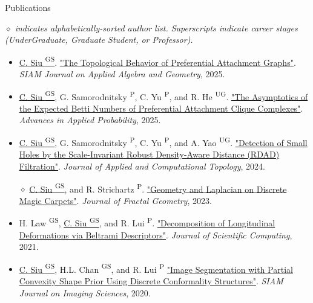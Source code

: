 \documentclass{resume} %
\begin{document}
\begin{rSection}{Publications}

\emph{$\diamond$ indicates alphabetically-sorted author list. Superscripts indicate career stages (UnderGraduate, Graduate Student, or Professor).}

\begin{itemize}[noitemsep]
    \item \underline{C. Siu {\textsuperscript{GS}}}. \href{https://epubs.siam.org/doi/10.1137/24M1693179}{"The Topological Behavior of Preferential Attachment Graphs"}. \emph{SIAM Journal on Applied Algebra and Geometry}, 2025.

    \item \underline{C. Siu {\textsuperscript{GS}}}, G. Samorodnitsky \textsuperscript{P}, C. Yu \textsuperscript{P}, and R. He \textsuperscript{UG}. \href{https://www.cambridge.org/core/journals/advances-in-applied-probability/article/asymptotics-of-the-expected-betti-numbers-of-preferential-attachment-clique-complexes/5A7074FC4F88DFDD609655A80B26C055}{"The Asymptotics of the Expected Betti Numbers of Preferential Attachment Clique Complexes"}. \emph{Advances in Applied Probability}, 2025.
    
    \item \underline{C. Siu {\textsuperscript{GS}}}, G. Samorodnitsky \textsuperscript{P}, C. Yu \textsuperscript{P}, and A. Yao \textsuperscript{UG}. \href{https://rdcu.be/dCXLa}{"Detection of Small Holes by the Scale-Invariant Robust Density-Aware Distance (RDAD) Filtration"}. \emph{Journal of Applied and Computational Topology}, 2024.
    
    \item[$\diamond$] \underline{C. Siu {\textsuperscript{GS}}}, and R. Strichartz \textsuperscript{P}. \href{https://ems.press/journals/jfg/articles/10964400}{"Geometry and Laplacian on Discrete Magic Carpets"}. \emph{Journal of Fractal Geometry}, 2023.
    
    \item H. Law {\textsuperscript{GS}}, \underline{C. Siu {\textsuperscript{GS}}}, and R. Lui \textsuperscript{P}. \href{https://doi.org/10.1007/s10915-021-01569-x}{"Decomposition of Longitudinal Deformations via Beltrami Descriptors"}. \emph{Journal of Scientific Computing}, 2021.
    
    \item \underline{C. Siu {\textsuperscript{GS}}}, H.L. Chan {\textsuperscript{GS}}, and R. Lui \textsuperscript{P} \href{https://doi.org/10.1137/19M129718X}{"Image Segmentation with Partial Convexity Shape Prior Using Discrete Conformality Structures"}. \emph{SIAM Journal on Imaging Sciences}, 2020.
    

\end{itemize}
\end{rSection}
\end{document}
